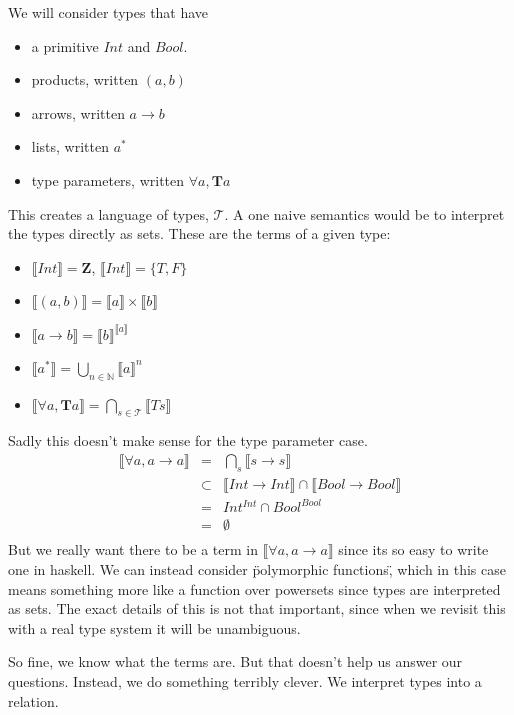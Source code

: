 \documentclass[12pt]{article}
\newcommand{\llb}{\llbracket}
\newcommand{\rrb}{\rrbracket}
\begin{document}
We will consider types that have 
\begin{itemize}
    \item a primitive $Int$ and $Bool$. 
    \item products, written $(a,b)$
    \item arrows, written $a \rightarrow b$
    \item lists, written $a^*$
    \item type parameters, written $\forall a, \mathbf{T} a$
\end{itemize}
\noindent This creates a language of types, $\mathcal{T}$. A one naive semantics would be to interpret the types directly as sets.
These are the terms of a given type:
\begin{itemize}
\item $ \llb Int \rrb  = \mathbf{Z}$, $ \llb Int \rrb  = \{T, F\}$
\item $ \llb (a,b) \rrb  = \llb a \rrb \times \llb b \rrb$ 
\item $ \llb a \rightarrow b \rrb  =  \llb b \rrb ^{\llb a \rrb}$ 
\item $ \llb a ^ * \rrb  =  \bigcup_{n \in \mathbb{N}} \llb a \rrb ^n$
\item $ \llb \forall a, \mathbf{T} a \rrb = \bigcap_{s \in \mathcal{T}} \llb T s \rrb $
\end{itemize}
\noindent Sadly this doesn't make sense for the type parameter case.
\begin{align*}
    \llb \forall a, a \rightarrow a \rrb & = & \bigcap_{s} \llb s \rightarrow s \rrb \\
     & \subset & \llb Int \rightarrow Int \rrb \cap \llb Bool \rightarrow Bool \rrb \\
     & = & Int^{Int} \cap Bool^{Bool} \\
     & = & \emptyset \\
\end{align*}
But we really want there to be a term in $\llb \forall a, a \rightarrow a \rrb$ since its so easy to write one in haskell.
We can instead consider \"polymorphic functions\", which in this case means something more like a function over powersets since types are interpreted as sets. 
The exact details of this is not that important, since when we revisit this with a real type system it will be unambiguous.

So fine, we know what the terms are. 
But that doesn't help us answer our questions.
Instead, we do something terribly clever. We interpret types into a relation.
\end{document}
